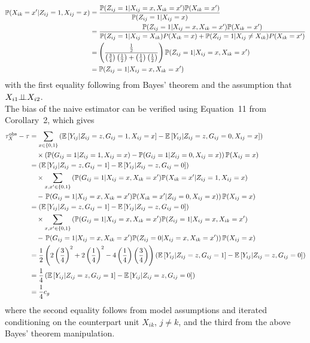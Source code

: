 \documentclass[10pt]{article}
\begin{document}
\begin{align*}
\P(X_{ik}=x'|Z_{ij}=1,X_{ij}=x) &= \frac{\P(Z_{ij}=1|X_{ij}=x,X_{ik}=x')\P(X_{ik}=x')}{\P(Z_{ij}=1|X_{ij}=x)} \\
&= \frac{\P(Z_{ij}=1|X_{ij}=x,X_{ik}=x')\P(X_{ik}=x')}{\P(Z_{ij}=1|X_{ij}=X_{ik})P(X_{ik}=x) + \P(Z_{ij}=1|X_{ij}\neq X_{ik})P(X_{ik}=x')} \\
&= \left(\frac{\frac{1}{2}}{\left(\frac{3}{4}\right)\left(\frac{1}{2}\right)+\left(\frac{1}{4}\right)\left(\frac{1}{2}\right)}\right)\P(Z_{ij}=1|X_{ij}=x,X_{ik}=x') \\
&= \P(Z_{ij}=1|X_{ij}=x,X_{ik}=x')
\end{align*}
with the first equality following from Bayes' theorem and the assumption that $X_{i1}\condind X_{i2}$.
\\

The bias of the naive estimator can be verified using Equation~11 from Corollary~2, which gives
\begin{align*}
\tau_{X}^\text{obs} - \tau &= \sum_{x\in\{0,1\}}\left(\E\left[Y_{ij}|Z_{ij}=z,G_{ij}=1,X_{ij}=x\right]-\E\left[Y_{ij}|Z_{ij}=z,G_{ij}=0,X_{ij}=x\right]\right) \\
&\quad \times\left(\P(G_{ij}=1|Z_{ij}=1,X_{ij}=x)-\P(G_{ij}=1|Z_{ij}=0,X_{ij}=x)\right)\P(X_{ij}=x) \\
&= \left(\E\left[Y_{ij}|Z_{ij}=z,G_{ij}=1\right]-\E\left[Y_{ij}|Z_{ij}=z,G_{ij}=0\right]\right) \\
&\quad \times\sum_{x,x'\in\{0,1\}}\left(\P(G_{ij}=1|X_{ij}=x,X_{ik}=x')\P(X_{ik}=x'|Z_{ij}=1,X_{ij}=x)\right. \\
&\quad - \left.\P(G_{ij}=1|X_{ij}=x,X_{ik}=x')\P(X_{ik}=x'|Z_{ij}=0,X_{ij}=x)\right)\P(X_{ij}=x) \\
&= \left(\E\left[Y_{ij}|Z_{ij}=z,G_{ij}=1\right]-\E\left[Y_{ij}|Z_{ij}=z,G_{ij}=0\right]\right) \\
&\quad \times\sum_{x,x'\in\{0,1\}}\left(\P(G_{ij}=1|X_{ij}=x,X_{ik}=x')\P(Z_{ij}=1|X_{ij}=x,X_{ik}=x')\right. \\
&\quad - \left.\P(G_{ij}=1|X_{ij}=x,X_{ik}=x')\P(Z_{ij}=0|X_{ij}=x,X_{ik}=x')\right)\P(X_{ij}=x) \\
&= \frac{1}{2}\left(2\left(\frac{3}{4}\right)^2+2\left(\frac{1}{4}\right)^2-4\left(\frac{1}{4}\right)\left(\frac{3}{4}\right)\right)\left(\E\left[Y_{ij}|Z_{ij}=z,G_{ij}=1\right]-\E\left[Y_{ij}|Z_{ij}=z,G_{ij}=0\right]\right) \\
&= \frac{1}{4}\left(\E\left[Y_{ij}|Z_{ij}=z,G_{ij}=1\right]-\E\left[Y_{ij}|Z_{ij}=z,G_{ij}=0\right]\right) \\
&= \frac{1}{4}c_g
\end{align*}
where the second equality follows from model assumptions and iterated conditioning on the counterpart unit $X_{ik}$, $j\neq k$, and the third from the above Bayes' theorem manipulation.
\end{document}
